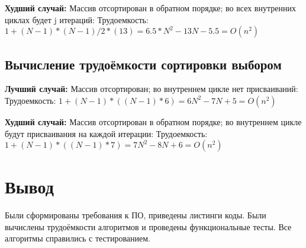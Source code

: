 \textbf{Худший случай:}  Массив отсортирован в обратном порядке; во всех внутренних циклах будет j итераций:\newline
Трудоемкость: $1 + (N-1) * (N - 1) / 2 * (13) = 6.5*N^2 - 13N - 5.5 = O(n^2) $

\subsection{Вычисление трудоёмкости сортировки выбором}
\textbf{Лучший случай:} Массив отсортирован; во внутреннем цикле нет присваиваний: \newline
Трудоемкость:  $1 + (N-1)*((N-1) * 6)  = 6N^2 - 7N + 5 = O(n^2)$


\textbf{Худший случай:}  Массив отсортирован в обратном порядке; во внутреннем цикле будут присваивания на каждой итерации:\newline
Трудоемкость: $1 + (N-1)*((N-1) * 7)  = 7N^2 - 8N + 6 = O(n^2)$

\section{Вывод}
Были сформированы требования к ПО, приведены листинги коды.
Были вычислены трудоёмкости алгоритмов и проведены функциональные тесты.
Все алгоритмы справились с тестированием.
